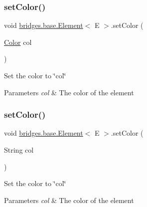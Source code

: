 \mbox{\label{classbridges_1_1base_1_1_element_aeb3336746d41a180e50b5efaff2dedc2}} 
\subsubsection{\texorpdfstring{setColor()}{setColor()}\hspace{0.1cm}{\footnotesize\ttfamily [1/2]}}
{\footnotesize\ttfamily void \mbox{\hyperlink{classbridges_1_1base_1_1_element}{bridges.\+base.\+Element}}$<$ E $>$.set\+Color (\begin{DoxyParamCaption}\item[{\mbox{\hyperlink{classbridges_1_1base_1_1_color}{Color}}}]{col }\end{DoxyParamCaption})}

Set the color to \char`\"{}col\char`\"{} 
\begin{DoxyParams}{Parameters}
{\em col} & The color of the element \\
\hline
\end{DoxyParams}
\mbox{\label{classbridges_1_1base_1_1_element_a336f2ff70a0873fde6f0b8a43b670ffc}} 
\subsubsection{\texorpdfstring{setColor()}{setColor()}\hspace{0.1cm}{\footnotesize\ttfamily [2/2]}}
{\footnotesize\ttfamily void \mbox{\hyperlink{classbridges_1_1base_1_1_element}{bridges.\+base.\+Element}}$<$ E $>$.set\+Color (\begin{DoxyParamCaption}\item[{String}]{col }\end{DoxyParamCaption})}

Set the color to \char`\"{}col\char`\"{} 
\begin{DoxyParams}{Parameters}
{\em col} & The color of the element \\
\hline
\end{DoxyParams}
\mbox{\label{classbridges_1_1base_1_1_element_a942ccd766aeca0c4fdbe27ef8cbe78d9}} 
